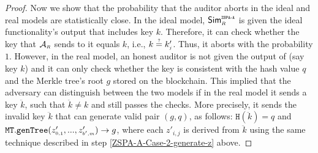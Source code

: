 \begin{proof}
Now we show that the probability that the auditor aborts in the ideal and real models are statistically close. In the ideal model, $\mathsf{Sim}^{\scriptscriptstyle \mathtt{ZSPA\text{-}A}}_{\scriptscriptstyle R}$ is given the ideal functionality's output that includes key $ k$. Therefore, it can check whether the key that $\mathcal{A}_{\scriptscriptstyle R}$ sends to it equals $ k$, i.e., $ k\stackrel{\scriptscriptstyle ?}=    k'_{\scriptscriptstyle j}$. Thus, it aborts with the probability $1$. However, in the real model, an honest auditor is not given the output of \ct (say key $k$) and it can only check whether the key is consistent with the hash value $q$ and the Merkle tree's root $g$ stored on the blockchain. This implied that the adversary can distinguish between the two models if in the real model it sends a key $\ddot k$, such that $\ddot k\neq k$ and still passes the checks. More precisely, it sends the invalid key $\ddot k$ that can generate  valid pair $(g, q)$, as follows: $\mathtt{H}(\ddot k)=q$ and $\mathtt{MT.genTree}(z'_{\scriptscriptstyle 0,1}, ..., z'_{\scriptscriptstyle b', m})\rightarrow  g$, where each $z'_{\scriptscriptstyle i,j}$ is derived from $\ddot k$ using the same technique described in step \ref{ZSPA-A-Case-2-generate-z} above. 


\end{proof}
